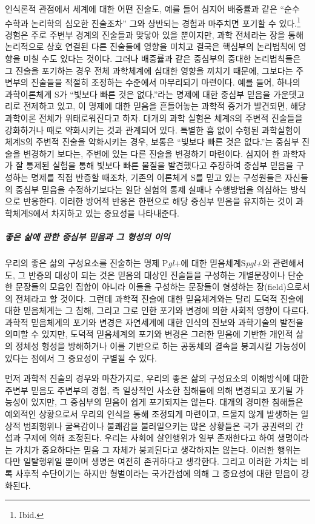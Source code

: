 인식론적 관점에서 세계에 대한 어떤 진술도, 예를 들어 심지어 배중률과 같은 ``순수 수학과 논리학의 심오한 진술조차'' 그와 상반되는 경험과 마주치면 포기할 수 있다.\footnote{Ibid.} 경험은 주로 주변부 경계의 진술들과 맞닿아 있을 뿐이지만, 과학 전체라는 장을 통해 논리적으로 상호 연결된 다른 진술들에 영향을 미치고 결국은 핵심부의 논리법칙에 영향을 미칠 수도 있다는 것이다. 그러나 배중률과 같은 중심부의 중대한 논리법칙들은 그 진술을 포기하는 경우 전체 과학체계에 심대한 영향을 끼치기 때문에, 그보다는 주변부의 진술들을 적절히 조정하는 수준에서 마무리되기 마련이다. 예를 들어, 하나의 과학이론체계 S가 ``빛보다 빠른 것은 없다.''라는 명제에 대한 중심부 믿음을 가운뎃고리로 전제하고 있고, 이 명제에 대한 믿음을 흔들어놓는 과학적 증거가 발견되면, 해당 과학이론 전체가 위태로워진다고 하자. 대개의 과학 실험은 체계S의 주변적 진술들을 강화하거나 때로 약화시키는 것과 관계되어 있다. 특별한 흠 없이 수행된 과학실험이 체계S의 주변적 진술을 약화시키는 경우, 보통은 ``빛보다 빠른 것은 없다.''는 중심부 진술을 변경하기 보다는, 주변에 있는 다른 진술을 변경하기 마련이다. 심지어 한 과학자가 잘 통제된 실험을 통해 빛보다 빠른 물질을 발견했다고 주장하여 중심부 믿음을 구성하는 명제를 직접 반증할 때조차, 기존의 이론체계 S를 믿고 있는 구성원들은 자신들의 중심부 믿음을 수정하기보다는 일단 실험의 통제 실패나 수행방법을 의심하는 방식으로 반응한다. 이러한 방어적 반응은 한편으로 해당 중심부 믿음을 유지하는 것이 과학체계S에서 차지하고 있는 중요성을 나타내준다.

\subparagraph{좋은 삶에 관한 중심부 믿음과 그 형성의 이익}

우리의 좋은 삶의 구성요소를 진술하는 명제 P\emph{gl}+에 대한 믿음체계S\emph{pgl+}와 관련해서도, 그 반증의 대상이 되는 것은 믿음의 대상인 진술들을 구성하는 개별문장이나 단순한 문장들의 모음인 집합이 아니라 이들을 구성하는 문장들이 형성하는 장(field)으로서의 전체라고 할 것이다. 그런데 과학적 진술에 대한 믿음체계와는 달리 도덕적 진술에 대한 믿음체계는 그 침해, 그리고 그로 인한 포기와 변경에 의한 사회적 영향이 다르다. 과학적 믿음체계의 포기와 변경은 자연세계에 대한 인식의 진보와 과학기술의 발전을 의미할 수 있지만, 도덕적 믿음체계의 포기와 변경은 그러한 믿음에 기반한 개인적 삶의 정체성 형성을 방해하거나 이를 기반으로 하는 공동체의 결속을 붕괴시킬 가능성이 있다는 점에서 그 중요성이 구별될 수 있다.

먼저 과학적 진술의 경우와 마찬가지로, 우리의 좋은 삶의 구성요소의 이해방식에 대한 주변부 믿음도 주변부의 경험, 즉 일상적인 사소한 침해들에 의해 변경되고 포기될 가능성이 있지만, 그 중심부의 믿음이 쉽게 포기되지는 않는다. 대개의 경미한 침해들은 예외적인 상황으로서 우리의 인식을 통해 조정되게 마련이고, 드물지 않게 발생하는 일상적 범죄행위나 굴욕감이나 불쾌감을 불러일으키는 많은 상황들은 국가 공권력의 간섭과 구제에 의해 조정된다. 우리는 사회에 살인행위가 일부 존재한다고 하여 생명이라는 가치가 중요하다는 믿음 그 자체가 붕괴된다고 생각하지는 않는다. 이러한 행위는 다만 일탈행위일 뿐이며 생명은 여전히 존귀하다고 생각한다. 그리고 이러한 가치는 비록 사후적 수단이기는 하지만 형벌이라는 국가간섭에 의해 그 중요성에 대한 믿음이 강화된다.

